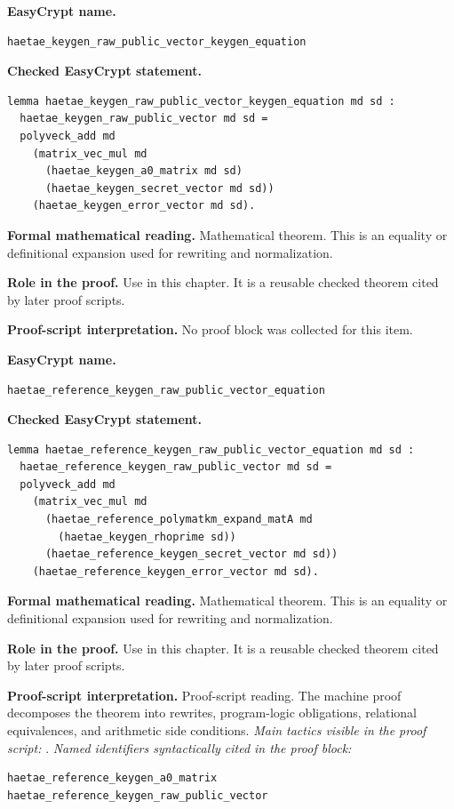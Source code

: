 \begin{formaltheorem}
\noindent\textbf{EasyCrypt name.}
\begin{lstlisting}[language=EasyCrypt,basicstyle=\ttfamily\scriptsize]
haetae_keygen_raw_public_vector_keygen_equation
\end{lstlisting}
\noindent\textbf{Checked EasyCrypt statement.}
\begin{lstlisting}[language=EasyCrypt,basicstyle=\ttfamily\scriptsize]
lemma haetae_keygen_raw_public_vector_keygen_equation md sd :
  haetae_keygen_raw_public_vector md sd =
  polyveck_add md
    (matrix_vec_mul md
      (haetae_keygen_a0_matrix md sd)
      (haetae_keygen_secret_vector md sd))
    (haetae_keygen_error_vector md sd).
\end{lstlisting}
\noindent\textbf{Formal mathematical reading.}
Mathematical theorem. This is an equality or definitional expansion used for rewriting and normalization.

\noindent\textbf{Role in the proof.}
Use in this chapter. It is a reusable checked theorem cited by later proof scripts.

\noindent\textbf{Proof-script interpretation.}
No proof block was collected for this item.

\end{formaltheorem}

\begin{formaltheorem}
\noindent\textbf{EasyCrypt name.}
\begin{lstlisting}[language=EasyCrypt,basicstyle=\ttfamily\scriptsize]
haetae_reference_keygen_raw_public_vector_equation
\end{lstlisting}
\noindent\textbf{Checked EasyCrypt statement.}
\begin{lstlisting}[language=EasyCrypt,basicstyle=\ttfamily\scriptsize]
lemma haetae_reference_keygen_raw_public_vector_equation md sd :
  haetae_reference_keygen_raw_public_vector md sd =
  polyveck_add md
    (matrix_vec_mul md
      (haetae_reference_polymatkm_expand_matA md
        (haetae_keygen_rhoprime sd))
      (haetae_reference_keygen_secret_vector md sd))
    (haetae_reference_keygen_error_vector md sd).
\end{lstlisting}
\noindent\textbf{Formal mathematical reading.}
Mathematical theorem. This is an equality or definitional expansion used for rewriting and normalization.

\noindent\textbf{Role in the proof.}
Use in this chapter. It is a reusable checked theorem cited by later proof scripts.

\noindent\textbf{Proof-script interpretation.}
Proof-script reading. The machine proof decomposes the theorem into rewrites, program-logic obligations, relational equivalences, and arithmetic side conditions.
\emph{Main tactics visible in the proof script:} .
\emph{Named identifiers syntactically cited in the proof block:}
\begin{lstlisting}[language=EasyCrypt,basicstyle=\ttfamily\scriptsize]
haetae_reference_keygen_a0_matrix
haetae_reference_keygen_raw_public_vector
\end{lstlisting}

\end{formaltheorem}

